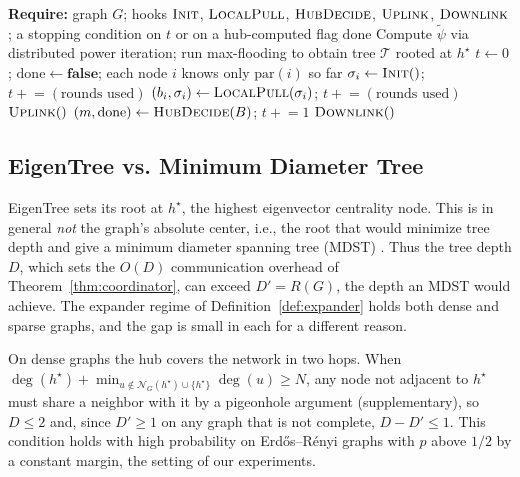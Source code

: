 \documentclass[letterpaper]{article} %
\begin{document}
\begin{algorithm}[tb]
\caption{EigenTree (generic protocol)}
\label{alg:merw-generic}
\begin{algorithmic}[1]
\STATE \textbf{Require:} graph $G$; hooks $\textsc{Init}$, $\textsc{LocalPull}$, $\textsc{HubDecide}$, $\textsc{Uplink}$, $\textsc{Downlink}$; a stopping condition on $t$ or on a hub-computed flag $\mathrm{done}$
\STATE Compute $\tilde\psi$ via distributed power iteration; run max-flooding to obtain tree $\mathcal{T}$ rooted at $h^\star$
\STATE $t \leftarrow 0$; $\mathrm{done} \leftarrow \textbf{false}$; each node $i$ knows only $\mathrm{par}(i)$ so far
    \STATE $\sigma_i \leftarrow \textsc{Init}()$; $t \mathrel{+}= (\text{rounds used})$
\ENDFOR
\REPEAT
        \STATE $(b_i, \sigma_i) \leftarrow \textsc{LocalPull}(\sigma_i)$; $t \mathrel{+}= (\text{rounds used})$
    \ENDFOR
	\STATE $\textsc{Uplink}()$
    \STATE $(m, \mathrm{done}) \leftarrow \textsc{HubDecide}(B)$; $t \mathrel{+}= 1$
	\STATE $\textsc{Downlink}()$
\end{algorithmic}
\end{algorithm}

\subsection{EigenTree vs. Minimum Diameter Tree}
\label{sec:mdst-gap}

EigenTree sets its root at $h^\star$, the highest eigenvector centrality node.
This is in general \emph{not} the graph's absolute center, i.e., the root that
would minimize tree depth and give a minimum diameter spanning tree (MDST)
\citep{hakimi1964,hassintamir1995}. Thus the tree depth $D$, which sets the
$O(D)$ communication overhead of Theorem~\ref{thm:coordinator}, can exceed
$D' = R(G)$, the depth an MDST would achieve. The expander regime of
Definition~\ref{def:expander} holds both dense and sparse graphs, and the gap
is small in each for a different reason.

On dense graphs the hub covers the network in two hops. When $\deg(h^\star) +
\min_{u \notin \mathcal{N}_G(h^\star)\cup\{h^\star\}} \deg(u) \geq N$, any node
not adjacent to $h^\star$ must share a neighbor with it by a pigeonhole
argument (supplementary), so $D \leq 2$ and, since $D' \geq 1$ on any graph
that is not complete, $D - D' \leq 1$. This condition holds with high
probability on Erd\H{o}s--R\'{e}nyi graphs with $p$ above $1/2$ by a constant
margin, the setting of our experiments.
\end{document}

